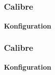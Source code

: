\documentclass[12pt,ngerman]{beamer}
\begin{document}
\begin{frame}
\frametitle{Calibre}
\framesubtitle{Konfiguration}

\begin{center}
\end{center}

\end{frame}


\begin{frame}
\frametitle{Calibre}
\framesubtitle{Konfiguration}

\begin{center}
\end{center}

\end{frame}
\end{document}
